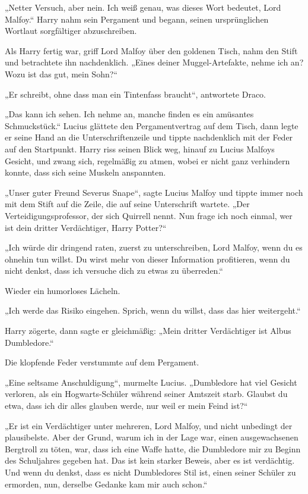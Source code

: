 {„Netter Versuch, aber nein. Ich weiß genau, was dieses Wort bedeutet, Lord Malfoy.“ Harry nahm sein Pergament und begann, seinen ursprünglichen Wortlaut sorgfältiger abzuschreiben.

Als Harry fertig war, griff Lord Malfoy über den goldenen Tisch, nahm den Stift und betrachtete ihn nachdenklich. „Eines deiner Muggel-Artefakte, nehme ich an? Wozu ist das gut, mein Sohn?“

„Er schreibt, ohne dass man ein Tintenfass braucht“, antwortete Draco.

„Das kann ich sehen. Ich nehme an, manche finden es ein amüsantes Schmuckstück.“ Lucius glättete den Pergamentvertrag auf dem Tisch, dann legte er seine Hand an die Unterschriftenzeile und tippte nachdenklich mit der Feder auf den Startpunkt. Harry riss seinen Blick weg, hinauf zu Lucius Malfoys Gesicht, und zwang sich, regelmäßig zu atmen, wobei er nicht ganz verhindern konnte, dass sich seine Muskeln anspannten.

„Unser guter Freund Severus Snape“, sagte Lucius Malfoy und tippte immer noch mit dem Stift auf die Zeile, die auf seine Unterschrift wartete. „Der Verteidigungsprofessor, der sich Quirrell nennt. Nun frage ich noch einmal, wer ist dein dritter Verdächtiger, Harry Potter?“

„Ich würde dir dringend raten, zuerst zu unterschreiben, Lord Malfoy, wenn du es ohnehin tun willst. Du wirst mehr von dieser Information profitieren, wenn du nicht denkst, dass ich versuche dich zu etwas zu überreden.“

Wieder ein humorloses Lächeln.

„Ich werde das Risiko eingehen. Sprich, wenn du willst, dass das hier weitergeht.“

Harry zögerte, dann sagte er gleichmäßig: „Mein dritter Verdächtiger ist Albus Dumbledore.“

Die klopfende Feder verstummte auf dem Pergament.

„Eine seltsame Anschuldigung“, murmelte Lucius. „Dumbledore hat viel Gesicht verloren, als ein Hogwarts-Schüler während seiner Amtszeit starb. Glaubst du etwa, dass ich dir alles glauben werde, nur weil er mein Feind ist?“

„Er ist ein Verdächtiger unter mehreren, Lord Malfoy, und nicht unbedingt der plausibelste. Aber der Grund, warum ich in der Lage war, einen ausgewachsenen Bergtroll zu töten, war, dass ich eine Waffe hatte, die Dumbledore mir zu Beginn des Schuljahres gegeben hat. Das ist kein starker Beweis, aber es ist verdächtig. Und wenn du denkst, dass es nicht Dumbledores Stil ist, einen seiner Schüler zu ermorden, nun, derselbe Gedanke kam mir auch schon.“

}
